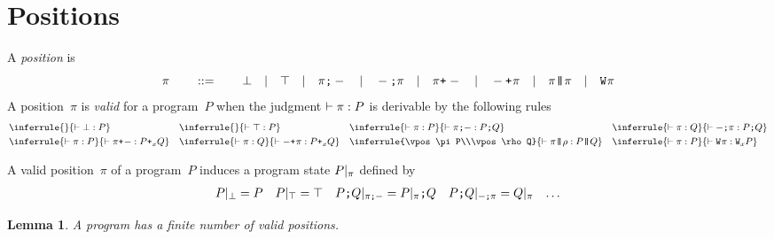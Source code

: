 \documentclass[a4paper]{article}
\theoremstyle{theorem}
\newtheorem{lemma}[theorem]{Lemma}
\theoremstyle{example}
\theoremstyle{remark}
\newtheorem{remark}[theorem]{Remark}
\begin{document}
\section{Positions}
A \emph{position} is
\[
  \pi
  \qquad::=\qquad
  \bot
  \quad|\quad
  \top
  \quad|\quad
  \pi\texttt{;}-
  \quad|\quad
  -\texttt{;}\pi
  \quad|\quad
  \pi\texttt{+}_{}-
  \quad|\quad
  -\texttt{+}_{}\pi
  \quad|\quad
  \pi\texttt{|\!\!|}\pi
  \quad|\quad
  \texttt{W}_{}\pi
\]
A position~$\pi$ is \emph{valid} for a program~$P$ when the judgment
$\vdash \pi:P$ is derivable by the following rules
\begin{align*}
  &
  \inferrule{\null}{\vpos\pbot P}
  &&
  \inferrule{\null}{\vpos\ptop P}
  &&
  \inferrule{\vpos\pi P}{\vpos{\pseql\pi}{\pseq PQ}}
  &&
  \inferrule{\vpos\pi Q}{\vpos{\pseqr\pi}{\pseq PQ}}
  \\
  &
  \inferrule{\vpos\pi P}{\vpos{\porl\pi}{\por xPQ}}
  &&
  \inferrule{\vpos\pi Q}{\vpos{\porr\pi}{\por xPQ}}
  &&
  \inferrule{\vpos\pi P\\\vpos\rho Q}{\vpos{\ppar\pi\rho}{\ppar PQ}}
  &&
  \inferrule{\vpos\pi P}{\vpos{\ploopl\pi}{\ploop xP}}
\end{align*}





A valid position~$\pi$ of a program~$P$ induces a program state $P|_{\pi}$
defined by
\begin{align*}
  P|_{\bot}&=P
  &
  P|_{\top}&=\top
  &
  P\texttt{;}Q|_{\pi\texttt{;}-}&=P|_{\pi}\texttt{;}Q
  &
  P\texttt{;}Q|_{-\texttt{;}\pi}&=Q|_{\pi}
  &
  \ldots
\end{align*}

\begin{lemma}
  A program has a finite number of valid positions.
\end{lemma}
\end{document}
